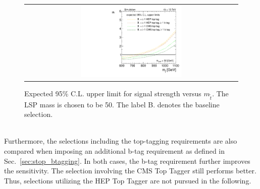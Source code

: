 \begin{figure}[!t]
  \centering
  \begin{tabular}{c}
                \includegraphics[width=0.49\textwidth]{figures/limitplot4BinSel_BaselineBTagTopTag_LSP50.pdf} 
  \end{tabular}
  \caption{Expected 95\% C.L. upper limit for signal strength versus $m_{\tilde{t}}$. The LSP mass is chosen to be 50\gev. The label B. denotes the baseline selection.}
  \label{fig:stop_baselinetoptag_limit}
\end{figure}
\\
Furthermore, the selections including the top-tagging requirements are also compared when imposing an additional b-tag requirement as defined in Sec.~\ref{sec:stop_btagging}. In both cases, the b-tag requirement further improves the sensitivity. The selection involving the CMS Top Tagger still performs better. Thus, selections utilizing the HEP Top Tagger are not pursued in the following.%


